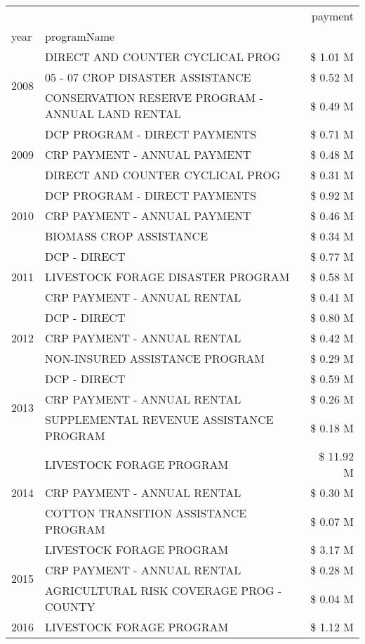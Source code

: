\begin{tabular}{llr}
\toprule
 &  & payment \\
year & programName &  \\
\midrule
\multirow[t]{3}{*}{2008} & DIRECT AND COUNTER CYCLICAL PROG & \$ 1.01 M \\
 & 05 - 07 CROP DISASTER ASSISTANCE & \$ 0.52 M \\
 & CONSERVATION RESERVE PROGRAM - ANNUAL LAND RENTAL & \$ 0.49 M \\
\cline{1-3}
\multirow[t]{3}{*}{2009} & DCP PROGRAM - DIRECT PAYMENTS & \$ 0.71 M \\
 & CRP PAYMENT - ANNUAL PAYMENT & \$ 0.48 M \\
 & DIRECT AND COUNTER CYCLICAL PROG & \$ 0.31 M \\
\cline{1-3}
\multirow[t]{3}{*}{2010} & DCP PROGRAM - DIRECT PAYMENTS & \$ 0.92 M \\
 & CRP PAYMENT - ANNUAL PAYMENT & \$ 0.46 M \\
 & BIOMASS CROP ASSISTANCE & \$ 0.34 M \\
\cline{1-3}
\multirow[t]{3}{*}{2011} & DCP - DIRECT & \$ 0.77 M \\
 & LIVESTOCK FORAGE DISASTER PROGRAM & \$ 0.58 M \\
 & CRP PAYMENT - ANNUAL RENTAL & \$ 0.41 M \\
\cline{1-3}
\multirow[t]{3}{*}{2012} & DCP - DIRECT & \$ 0.80 M \\
 & CRP PAYMENT - ANNUAL RENTAL & \$ 0.42 M \\
 & NON-INSURED ASSISTANCE PROGRAM & \$ 0.29 M \\
\cline{1-3}
\multirow[t]{3}{*}{2013} & DCP - DIRECT & \$ 0.59 M \\
 & CRP PAYMENT - ANNUAL RENTAL & \$ 0.26 M \\
 & SUPPLEMENTAL REVENUE ASSISTANCE PROGRAM & \$ 0.18 M \\
\cline{1-3}
\multirow[t]{3}{*}{2014} & LIVESTOCK FORAGE PROGRAM & \$ 11.92 M \\
 & CRP PAYMENT - ANNUAL RENTAL & \$ 0.30 M \\
 & COTTON TRANSITION ASSISTANCE PROGRAM & \$ 0.07 M \\
\cline{1-3}
\multirow[t]{3}{*}{2015} & LIVESTOCK FORAGE PROGRAM & \$ 3.17 M \\
 & CRP PAYMENT - ANNUAL RENTAL & \$ 0.28 M \\
 & AGRICULTURAL RISK COVERAGE PROG - COUNTY & \$ 0.04 M \\
\cline{1-3}
\multirow[t]{3}{*}{2016} & LIVESTOCK FORAGE PROGRAM & \$ 1.12 M \\

\end{tabular}
